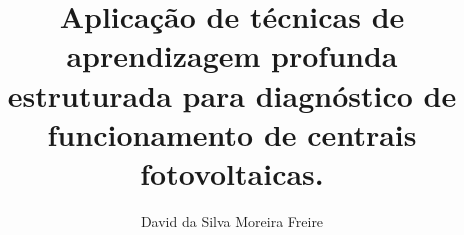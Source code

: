 \documentclass[11pt,a4paper,twoside,openright]{report}
\begin{document}
\title{Aplicação de técnicas de aprendizagem profunda estruturada para diagnóstico de funcionamento de centrais fotovoltaicas.}
\author{David da Silva Moreira Freire}









\begin{Prolog}
  \cleardoublepage
  \tableofcontents
  \cleardoublepage
  \listoffigures
  \cleardoublepage
  \listoftables
\end{Prolog}

\StartBody

 





\appendix






\end{document}

